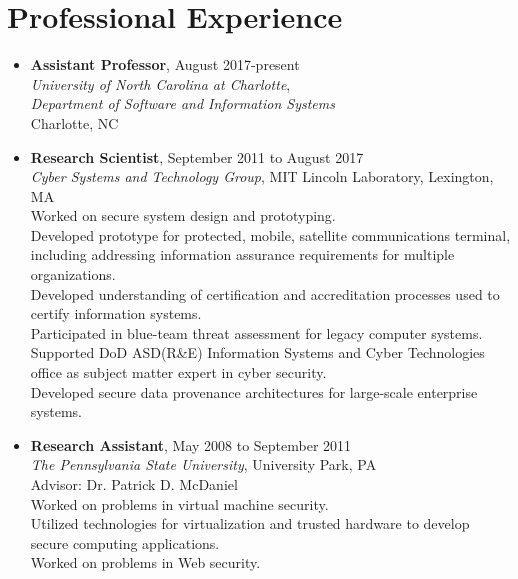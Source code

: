 \documentclass[10pt]{article}
\providecommand{\tightlist}{%
  \setlength{\itemsep}{0.25em}}
\begin{document}
\hypertarget{professional-experience}{%
\section{Professional Experience}\label{professional-experience}}

\begin{itemize}
\tightlist
\item \textbf{Assistant Professor}, August 2017-present\\
  \textit{University of North Carolina at Charlotte},\\
  \textit{Department of Software and Information Systems}\\
  Charlotte, NC\\

\item \textbf{Research Scientist}, September 2011 to August 2017\\
  \textit{Cyber Systems and Technology Group}, MIT Lincoln Laboratory, Lexington, MA\\
  Worked on secure system design and prototyping.\\
  Developed prototype for protected, mobile, satellite communications terminal, including addressing information assurance requirements for multiple organizations.\\
  Developed understanding of certification and accreditation processes used to certify information systems.\\
  Participated in blue-team threat assessment for legacy computer systems.\\
  Supported DoD ASD(R\&E) Information Systems and Cyber Technologies office as subject matter expert in cyber security.\\
  Developed secure data provenance architectures for large-scale enterprise systems.\\

\item \textbf{Research Assistant}, May 2008 to September 2011\\
  \textit{The Pennsylvania State University},
  University Park, PA\\
  Advisor: Dr. Patrick D. McDaniel\\
  Worked on problems in virtual machine security.\\
  Utilized technologies for virtualization and trusted hardware to develop secure computing applications.\\
  Worked on problems in Web security.


\end{itemize}
\end{document}
